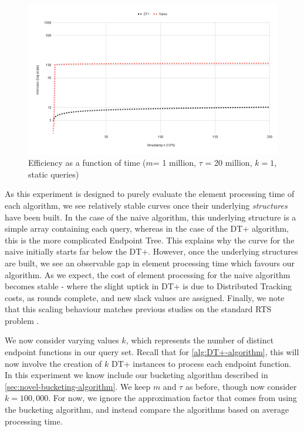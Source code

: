 \begin{center}
\begin{figure}[h]
\centering
\includegraphics[scale=0.45]{thesis/figures/chart1.1.png}
\caption{Efficiency as a function of time ($m$= 1 million, $\tau$ = 20 million, $k=1$, static queries)}
\end{figure}
\end{center}

As this experiment is designed to purely evaluate the element processing time of each algorithm, we see relatively stable curves once their underlying \textit{structures} have been built. In the case of the naive algorithm, this underlying structure is a simple array containing each query, whereas in the case of the DT+ algorithm, this is the more complicated Endpoint Tree. This explains why the curve for the naive initially starts far below the DT+. However, once the underlying structures are built, we see an observable gap in element processing time which favours our algorithm. As we expect, the cost of element processing for the naive algorithm becomes stable - where the slight uptick in DT+ is due to Distributed Tracking costs, as rounds complete, and new slack values are assigned. Finally, we note that this scaling behaviour matches previous studies on the standard RTS problem \cite{GAN16, DBLP:conf/sigmod/ZhangGBKCZ22}.

We now consider varying values $k$, which represents the number of distinct endpoint functions in our query set. Recall that for \cref{alg:DT+-algorithm}, this will now involve the creation of $k$ DT+ instances to process each endpoint function. In this experiment we know include our bucketing algorithm described in \cref{sec:novel-bucketing-algorithm}. We keep $m$ and $\tau$ as before, though now consider $k = 100,000$. For now, we ignore the approximation factor that comes from using the bucketing algorithm, and instead compare the algorithms based on average processing time. 

